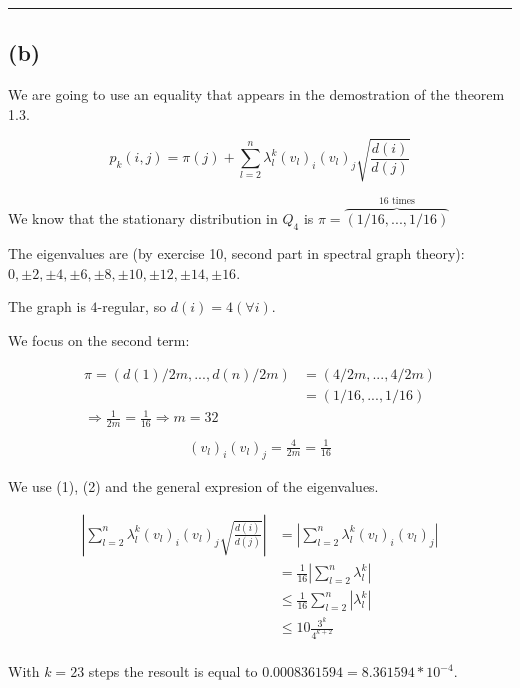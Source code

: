 \documentclass{article}
\begin{document}
\noindent
{\color{gray} \rule{\linewidth}{0.5mm} }
\newpage

\subsection*{(b)}

\noindent We are going to use an equality that appears in the demostration of the theorem 1.3.

$$
p_{k}(i, j) = \pi(j) + \sum_{l = 2}^{n} \lambda_{l}^{k}(v_l)_i (v_l)_j \sqrt{\frac{d(i)}{d(j)}}
$$

\noindent We know that the stationary distribution in $Q_4$ is $\pi = \overbrace{(1/16, ..., 1/16)}^{16 \text{ times}}$

\noindent The eigenvalues are (by exercise 10, second part in spectral graph theory): $0, \pm 2, \pm 4, \pm 6, \pm 8, \pm 10, \pm 12, \pm 14, \pm 16$.

\noindent The graph is $4$-regular, so $d(i) = 4 (\forall i)$.

\noindent We focus on the second term:

\begin{align}
     \nonumber \pi = (d(1)/2m, ..., d(n)/2m) & = (4/2m, ..., 4/2m) \\ \nonumber & = (1/16, ..., 1/16) \\  \Rightarrow \frac{1}{2m} = \frac{1}{16} \Rightarrow  m = 32\\ \nonumber
\end{align}
\begin{align}
     (v_l)_i (v_l)_j = \frac{4}{2m} = \frac{1}{16}
\end{align}
 
\noindent We use (1), (2) and the general expresion of the eigenvalues.

\begin{align}
    \nonumber | \sum_{l = 2}^{n} \lambda_{l}^{k}(v_l)_i (v_l)_j \sqrt{\frac{d(i)}{d(j)}} | & = | \sum_{l = 2}^{n} \lambda_{l}^{k}(v_l)_i (v_l)_j | \\ \nonumber & =   \frac{1}{16} | \sum_{l = 2}^{n} \lambda_{l}^{k} | \\ \nonumber & \leq \frac{1}{16} \sum_{l = 2}^{n} | \lambda_{l}^{k} | \\ \nonumber & \leq 10  \frac{3^k}{4^{k+2}}\\ \nonumber
\end{align}
 
\noindent With $k = 23$ steps the resoult is equal to $0.0008361594 = 8.361594 * 10^{-4}$.
\end{document}
